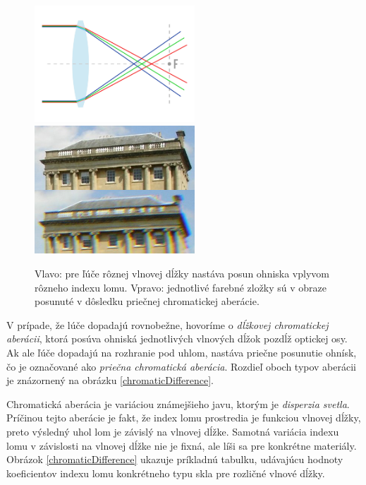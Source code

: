 \begin{figure}[h]
\centering
\label{chromaticFocus}
\includegraphics[width=6cm]{obrazky-figures/chromaticFocus.jpg}
\includegraphics[width=6cm]{obrazky-figures/chromaticAberrationWikipedia.jpg}
\caption{Vlavo: pre ľúče rôznej vlnovej dĺžky nastáva posun ohniska vplyvom rôzneho indexu lomu. Vpravo:
   jednotlivé farebné zložky sú v obraze posunuté v dôsledku priečnej chromatickej aberácie.}
\end{figure}

V prípade, že lúče dopadajú rovnobežne, hovoríme o
\textit{dĺžkovej chromatickej aberácii}, ktorá posúva ohniská jednotlivých vlnových dĺžok pozdĺž optickej
osy. Ak ale ľúče dopadajú na rozhranie pod uhlom, nastáva priečne posunutie ohnísk, čo je označované
ako \textit{priečna chromatická aberácia}. Rozdieľ oboch typov aberácii je znázornený na obrázku
\ref{chromaticDifference}.

Chromatická aberácia je variáciou známejšieho javu, ktorým je \textit{disperzia svetla}.
Príčinou tejto aberácie je fakt, že index lomu prostredia je funkciou vlnovej dĺžky, preto výsledný
uhol lom je závislý na vlnovej dĺžke. Samotná variácia indexu lomu v závislosti na vlnovej dĺžke nie
je fixná, ale líši sa pre konkrétne materiály. Obrázok \ref{chromaticDifference} ukazuje príkladnú
tabulku, udávajúcu hodnoty koeficientov indexu lomu konkrétneho typu skla pre rozličné vlnové dĺžky.

